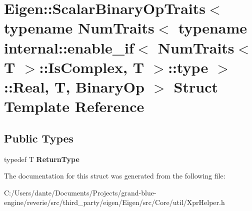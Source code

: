 \hypertarget{struct_eigen_1_1_scalar_binary_op_traits_3_01typename_01_num_traits_3_01typename_01internal_1_1e682c29bad5c4221eece44bbf2be041d0}{}\section{Eigen\+::Scalar\+Binary\+Op\+Traits$<$ typename Num\+Traits$<$ typename internal\+::enable\+\_\+if$<$ Num\+Traits$<$ T $>$\+::Is\+Complex, T $>$\+::type $>$\+::Real, T, Binary\+Op $>$ Struct Template Reference}
\label{struct_eigen_1_1_scalar_binary_op_traits_3_01typename_01_num_traits_3_01typename_01internal_1_1e682c29bad5c4221eece44bbf2be041d0}
\subsection*{Public Types}
\begin{DoxyCompactItemize}
\item 
\mbox{\label{struct_eigen_1_1_scalar_binary_op_traits_3_01typename_01_num_traits_3_01typename_01internal_1_1e682c29bad5c4221eece44bbf2be041d0_a06cb8365d175cb46f94c2c335b902c7a}} 
typedef T {\bfseries Return\+Type}
\end{DoxyCompactItemize}


The documentation for this struct was generated from the following file\+:\begin{DoxyCompactItemize}
\item 
C\+:/\+Users/dante/\+Documents/\+Projects/grand-\/blue-\/engine/reverie/src/third\+\_\+party/eigen/\+Eigen/src/\+Core/util/Xpr\+Helper.\+h\end{DoxyCompactItemize}
